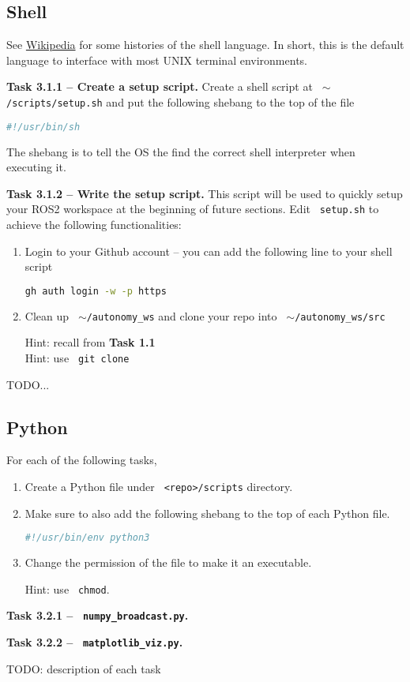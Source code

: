 \documentclass{article}
\def\code#1{\texttt{\color{magenta} #1}}
\begin{document}
\subsection{Shell}
See \href{https://en.wikipedia.org/wiki/Shell_script}{Wikipedia} for some histories 
of the shell language. In short, this is the default language to interface with most 
UNIX terminal environments.

{\bf Task 3.1.1 -- Create a setup script.} Create a shell script at \code{$\sim$/scripts/setup.sh}
and put the following shebang to the top of the file
\begin{lstlisting}[language=sh, numbers=none]
#!/usr/bin/sh
\end{lstlisting}
The shebang is to tell the OS the find the correct shell interpreter when executing it.

{\bf Task 3.1.2 -- Write the setup script.} This script will be used to quickly setup
your ROS2 workspace at the beginning of future sections. Edit \code{setup.sh} to achieve
the following functionalities:

\begin{enumerate}
\item Login to your Github account -- you can add the following line to your shell script
\begin{lstlisting}[language=sh, numbers=none]
gh auth login -w -p https
\end{lstlisting}

\item Clean up \code{$\sim$/autonomy\_ws} and clone your repo into \code{$\sim$/autonomy\_ws/src}

  Hint: recall from {\bf Task 1.1}\\
  Hint: use \code{git clone}
\end{enumerate}

TODO...


\subsection{Python}
For each of the following tasks, 
\begin{enumerate}
\item Create a Python file under \code{<repo>/scripts} directory.

\item Make sure to also add the following shebang to the top of each Python file.
\begin{lstlisting}[language=sh, numbers=none]
#!/usr/bin/env python3
\end{lstlisting}

\item Change the permission of the file to make it an executable.

    Hint: use \code{chmod}.
\end{enumerate}


{\bf Task 3.2.1 -- \code{numpy\_broadcast.py}.}

{\bf Task 3.2.2 -- \code{matplotlib\_viz.py}.}

TODO: description of each task
\end{document}
